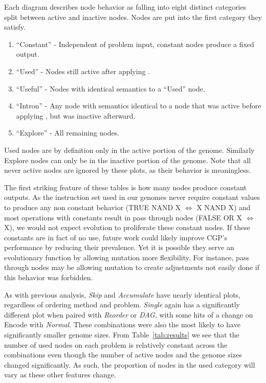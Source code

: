 \documentclass[journal]{IEEEtran}
\begin{document}
Each diagram describes node behavior as falling into eight distinct categories
split between active and inactive nodes.  Nodes are put into the first category
they satisfy.
\begin{enumerate}
\item ``Constant'' - Independent of problem input, constant nodes produce a fixed output.
\item ``Used'' - Nodes still active after applying .
\item ``Useful'' - Nodes with identical semantics to a ``Used'' node.
\item ``Intron'' - Any node with semantics identical to a node that was
                   active before applying , but was inactive afterward.
\item ``Explore'' - All remaining nodes.
\end{enumerate}
Used nodes are by definition only in the active portion of the genome.  Similarly
Explore nodes can only be in the inactive portion of the genome.   Note that
all never active nodes are ignored by these plots, as their behavior is meaningless.

The first striking feature of these tables is how many nodes produce constant
outputs.  As the instruction set used in our genomes never require constant values
to produce any non constant behavior (TRUE NAND X $\Leftrightarrow$ X NAND X)
and most operations with constants result in pass through nodes
(FALSE OR X $\Leftrightarrow$ X), we would not expect evolution to proliferate
these constant nodes.  If these constants are in fact of no use, future work
could likely improve CGP's performance by reducing their prevalence.  Yet
it is possible they serve an evolutionary function by allowing mutation more
flexibility.  For instance, pass through nodes may be allowing mutation to create
adjustments not easily done if this behavior was forbidden.

As with previous analysis, \emph{Skip} and \emph{Accumulate} have nearly identical
plots, regardless of ordering method and problem.  \emph{Single} again has
a significantly different plot when paired with \emph{Reorder} or \emph{DAG},
with some hits of a change on Encode with \emph{Normal}.  These combinations
were also the most likely to have significantly smaller genome sizes.  From
Table~\ref{tab:results} we see that the number of used nodes on each problem is relatively
constant across the combinations even though the number of active nodes and the
genome sizes changed significantly.  As such, the proportion of nodes in the
used category will vary as these other features change.
\end{document}
